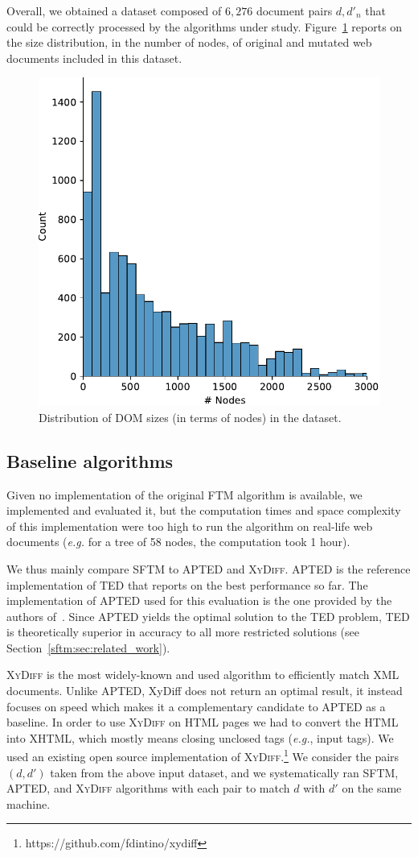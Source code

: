 Overall, we obtained a dataset composed of $6,276$ document pairs $d,d'_n$ that could be correctly processed by the algorithms under study.
Figure~\ref{sftm:fig:distribution} reports on the size distribution, in the number of nodes, of original and mutated web documents included in this dataset.

\begin{figure}
    \centering
    \includegraphics[width=.6\linewidth]{tree-matching/graphs/distribution_size}
    \caption{Distribution of DOM sizes (in terms of nodes) in the dataset.}
    \label{sftm:fig:distribution}
\end{figure}

\subsection{Baseline algorithms}
Given no implementation of the original FTM algorithm is available, we implemented and evaluated it, but the computation times and space complexity of this implementation were too high to run the algorithm on real-life web documents (\emph{e.g.} for a tree of 58 nodes, the computation took 1 hour).

We thus mainly compare SFTM to APTED and \textsc{XyDiff}.
APTED is the reference implementation of TED that reports on the best performance so far.
The implementation of APTED used for this evaluation is the one provided by the authors of~\cite{pawlik2016tree,pawlik2015efficient}.
Since APTED yields the optimal solution to the TED problem, TED is theoretically superior in accuracy to all more restricted solutions (see Section~\ref{sftm:sec:related_work}).

\textsc{XyDiff} is the most widely-known and used algorithm to efficiently match XML documents. Unlike APTED, XyDiff does not return an optimal result, it instead focuses on speed which makes it a complementary candidate to APTED as a baseline. 
In order to use \textsc{XyDiff} on HTML pages we had to convert the HTML into XHTML, which mostly means closing unclosed tags (\emph{e.g.}, input tags).
We used an existing open source implementation of \textsc{XyDiff}.\footnote{https://github.com/fdintino/xydiff}
We consider the pairs $(d,d')$ taken from the above input dataset, and we systematically ran SFTM, APTED, and \textsc{XyDiff} algorithms with each pair to match $d$ with $d'$ on the same machine.

